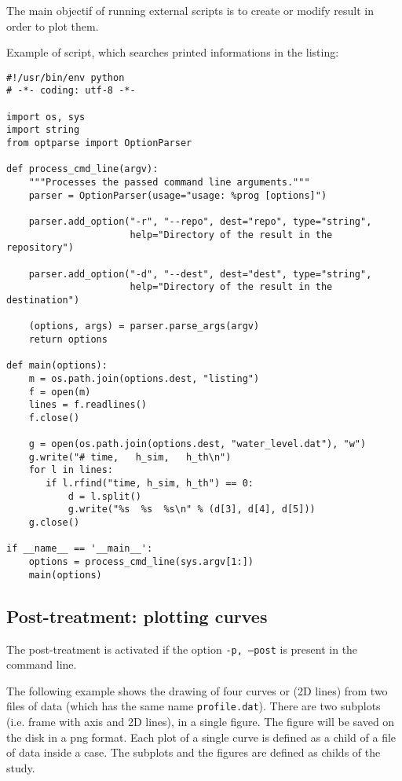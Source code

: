 \documentclass[a4paper,10pt,twoside]{article}
\begin{document}
The main objectif of running external scripts is to create or modify
result in order to plot them.

Example of script, which searches printed informations in the listing:
\begin{verbatim}
#!/usr/bin/env python
# -*- coding: utf-8 -*-

import os, sys
import string
from optparse import OptionParser

def process_cmd_line(argv):
    """Processes the passed command line arguments."""
    parser = OptionParser(usage="usage: %prog [options]")

    parser.add_option("-r", "--repo", dest="repo", type="string",
                      help="Directory of the result in the repository")

    parser.add_option("-d", "--dest", dest="dest", type="string",
                      help="Directory of the result in the destination")

    (options, args) = parser.parse_args(argv)
    return options

def main(options):
    m = os.path.join(options.dest, "listing")
    f = open(m)
    lines = f.readlines()
    f.close()

    g = open(os.path.join(options.dest, "water_level.dat"), "w")
    g.write("# time,   h_sim,   h_th\n")
    for l in lines:
       if l.rfind("time, h_sim, h_th") == 0:
           d = l.split()
           g.write("%s  %s  %s\n" % (d[3], d[4], d[5]))
    g.close()

if __name__ == '__main__':
    options = process_cmd_line(sys.argv[1:])
    main(options)
\end{verbatim}

\subsection{Post-treatment: plotting curves}

The post-treatment is activated if the option \texttt{-p, --post} is present in the command line.

The following example shows the drawing of four curves or (2D lines) from two files of data (which
has the same name \texttt{profile.dat}). There are two subplots (i.e. frame with axis and 2D lines),
in a single figure. The figure will be saved on the disk in a png format.
Each plot of a single curve is defined as a child of a file of data inside a case. The subplots and 
the figures are defined as childs of the study.
\end{document}
